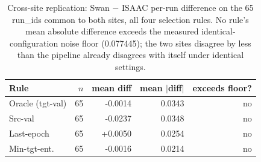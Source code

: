 \begin{table}[t]
\centering
\caption{Cross-site replication: Swan $-$ ISAAC per-run difference on the 65 run\_ids common to both sites, all four selection rules. No rule's mean absolute difference exceeds the measured identical-configuration noise floor (0.077445); the two sites disagree by less than the pipeline already disagrees with itself under identical settings.}
\label{tab:crosssite_summary}
\footnotesize
\begin{tabular}{lrrrr}
\toprule
Rule & $n$ & mean diff & mean $|$diff$|$ & exceeds floor? \\
\midrule
Oracle (tgt-val) & 65 & -0.0014 & 0.0343 & no \\
Src-val & 65 & -0.0237 & 0.0348 & no \\
Last-epoch & 65 & +0.0050 & 0.0254 & no \\
Min-tgt-ent. & 65 & -0.0016 & 0.0214 & no \\
\bottomrule
\end{tabular}
\end{table}
